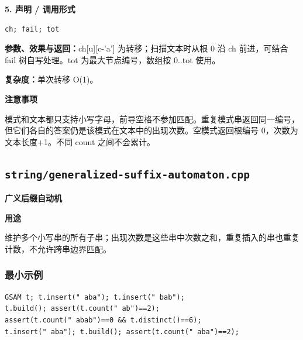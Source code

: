\documentclass[UTF8,a4paper,10pt]{ctexart}
\newcommand{\TemplUsage}[1]{\textbf{用途}\par #1\par}
\newcommand{\TemplNote}[1]{\textbf{注意事项}\par #1\par}
\begin{document}
\noindent\begin{minipage}{\textwidth}
\textbf{5. 声明 / 调用形式}
\begin{lstlisting}
ch; fail; tot
\end{lstlisting}
\textbf{参数、效果与返回：}ch[u][c-'a'] 为转移；扫描文本时从根 0 沿 ch 前进，可结合 fail 树自写处理。tot 为最大节点编号，数组按 0..tot 使用。

\textbf{复杂度：}单次转移 O(1)。

\TemplNote{模式和文本都只支持小写字母，前导空格不参加匹配。重复模式串返回同一编号，但它们各自的答案仍是该模式在文本中的出现次数。空模式返回根编号 0，次数为文本长度+1。不同 count 之间不会累计。}
\end{minipage}\par\vspace{0.4em}
\clearpage
\subsection{\texttt{string/generalized-suffix-automaton.cpp}}
\textbf{广义后缀自动机}\par
\TemplUsage{维护多个小写串的所有子串；出现次数是这些串中次数之和，重复插入的串也重复计数，不允许跨串边界匹配。}
\subsubsection*{最小示例}
\begin{lstlisting}
GSAM t; t.insert(" aba"); t.insert(" bab");
t.build(); assert(t.count(" ab")==2);
assert(t.count(" abab")==0 && t.distinct()==6);
t.insert(" aba"); t.build(); assert(t.count(" aba")==2);
\end{lstlisting}
\end{document}
